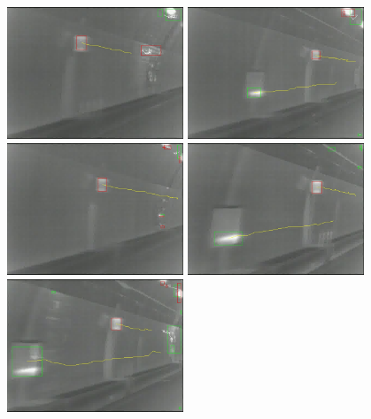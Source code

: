\begin{figure}
{
\includegraphics[width=0.47\textwidth,bb=0 0 640 480]{17veriTrjimg00039.jpg}
}
{
\includegraphics[width=0.47\textwidth,bb=0 0 640 480]{8veriTrjimg00028.jpg}
}\\
{
\includegraphics[width=0.47\textwidth,bb=0 0 640 480]{19veriTrjimg00041.jpg}
}
{
\includegraphics[width=0.47\textwidth,bb=0 0 640 480]{3veriTrjimg00023.jpg}
}\\
{
\includegraphics[width=0.47\textwidth,bb=0 0 640 480]{04veriTrjimg00039.jpg}
}
\end{figure}
